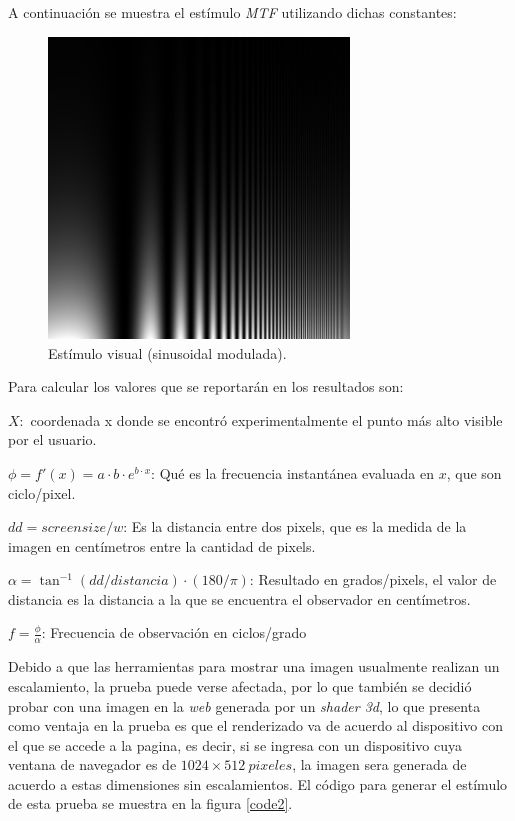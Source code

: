 \documentclass[conference]{IEEEtran}
\def\shadowLine{\vspace{3mm}}
\begin{document}
\shadowLine
A continuación se muestra el estímulo \textit{MTF} utilizando dichas constantes:

\begin{figure}[htbp]
\centerline{\includegraphics[width=80mm]{code/mtf}}
\caption{Estímulo visual (sinusoidal modulada).}
\label{mtf}
\end{figure}

Para calcular los valores que se reportarán en los resultados son:

$X:$ coordenada x donde se encontró experimentalmente el punto más alto visible por el usuario.

$\phi=f'(x)= a\cdot b\cdot e^{b\cdot x}$: Qué es la frecuencia instantánea evaluada en $x$, que son ciclo/pixel.

$dd = screensize/w$: Es la distancia entre dos pixels, que es la medida de la imagen en centímetros entre la cantidad de pixels.

$\alpha= \tan^{-1}(dd/distancia)\cdot (180/\pi)$: Resultado en grados/pixels, el valor de distancia es la distancia a la que se encuentra el observador en centímetros.

\shadowLine
$f=\displaystyle\frac{\phi}{\alpha}$: Frecuencia de observación en ciclos/grado


Debido a que las herramientas para mostrar una imagen usualmente realizan un
escalamiento, la prueba puede verse afectada, por lo que también se decidió probar con una imagen en la \textit{web} generada por un \textit{shader 3d}, lo que
presenta como ventaja en la prueba es que el renderizado va de acuerdo al dispositivo
con el que se accede a la pagina, es decir, si se ingresa con un dispositivo
cuya ventana de navegador es de $1024 \times 512\ pixeles$, la imagen sera generada de
acuerdo a estas dimensiones sin escalamientos. El código para generar el estímulo de esta prueba se muestra en la figura \ref{code2}.
\end{document}
